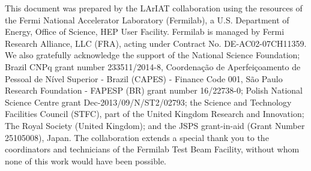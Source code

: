 This document was prepared by the LArIAT collaboration using the resources of the Fermi National Accelerator Laboratory (Fermilab), a U.S. Department of Energy, Office of Science, HEP User Facility. Fermilab is managed by Fermi Research Alliance, LLC (FRA), acting under Contract No. DE-AC02-07CH11359. We also gratefully acknowledge the support of the National Science Foundation; Brazil CNPq grant number 233511/2014-8, Coordena\c{c}\~ao de Aperfei\c{c}oamento de Pessoal de N\'ivel Superior - Brazil (CAPES) - Finance Code 001, S\~ao Paulo Research Foundation - FAPESP (BR) grant number 16/22738-0; Polish National Science Centre grant Dec-2013/09/N/ST2/02793; the Science and Technology Facilities Council (STFC), part of the United Kingdom Research and Innovation; The Royal Society (United Kingdom); and the JSPS grant-in-aid (Grant Number 25105008), Japan. The collaboration extends a special thank you to the coordinators and technicians of the Fermilab Test Beam Facility, without whom none of this work would have been possible.



